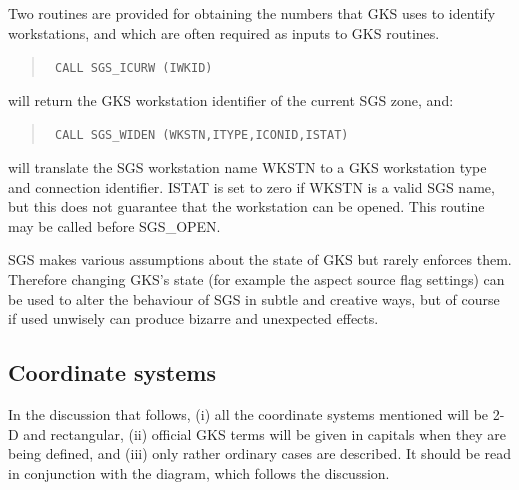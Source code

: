 \documentclass[11pt]{article}
\newcommand{\htmlref}[2]{#1}
\begin{document}
Two routines are provided for obtaining the numbers that GKS uses to identify
workstations, and which are often required as inputs to GKS routines.
\begin{quote}{\tt
    CALL \htmlref{SGS\_ICURW}{SGS_ICURW} (IWKID)}
\end{quote}
will return the GKS workstation identifier of the current SGS zone, and:
\begin{quote}{\tt
    CALL \htmlref{SGS\_WIDEN}{SGS_WIDEN} (WKSTN,ITYPE,ICONID,ISTAT)}
\end{quote}
will translate the SGS workstation name WKSTN to a GKS workstation type and
connection identifier.
ISTAT is set to zero if WKSTN is a valid SGS name, but this does not guarantee
that the workstation can be opened.
This routine may be called before SGS\_OPEN.

SGS makes various assumptions about the state of GKS but rarely enforces them.
Therefore changing GKS's state (for example the aspect source flag settings)
can be used to alter the behaviour of SGS in subtle and creative ways, but of
course if used unwisely can produce bizarre and unexpected effects.

\subsection* {Coordinate systems}\label{app-coordinates}

In the discussion that follows, (i) all the coordinate systems
mentioned will be 2-D and rectangular, (ii) official
GKS terms will be given in capitals when they are being
defined, and (iii) only rather ordinary cases are described.  It
should be read in conjunction with the diagram, which follows the
discussion.
                     
\end{document}
